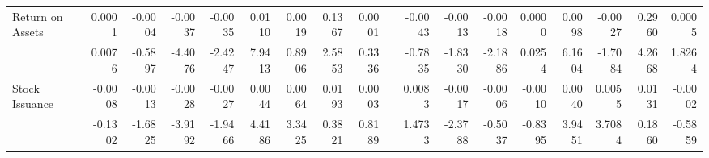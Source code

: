\begin{table}[h]
{\begin{tabular}{lrrrrrrrrrrrrrrrrr}
      Return on Assets & 0.0001 & -0.0004 & -0.0037 & -0.0035 & 0.0110 & 0.0019 & 0.1367 & 0.0001 &       & -0.0043 & -0.0013 & -0.0018 & 0.0000 & 0.0098 & -0.0027 & 0.2960 & 0.0005 \\
            & 0.0076 & -0.5897 & -4.4076 & -2.4247 & 7.9413 & 0.8906 & 2.5853 & 0.3336 &       & -0.7835 & -1.8330 & -2.1886 & 0.0254 & 6.1604 & -1.7084 & 4.2668 & 1.8264 \\
      Stock Issuance & -0.0008 & -0.0013 & -0.0028 & -0.0027 & 0.0044 & 0.0064 & 0.0193 & 0.0003 &       & 0.0083 & -0.0017 & -0.0006 & -0.0010 & 0.0040 & 0.0055 & 0.0131 & -0.0002 \\
            & -0.1302 & -1.6825 & -3.9192 & -1.9466 & 4.4186 & 3.3425 & 0.3821 & 0.8189 &       & 1.4733 & -2.3788 & -0.5037 & -0.8395 & 3.9451 & 3.7084 & 0.1860 & -0.5859 \\
      \bottomrule
      \end{tabular}%
    }
    \label{tab:liq-ff6v}%
  \end{table}%
  